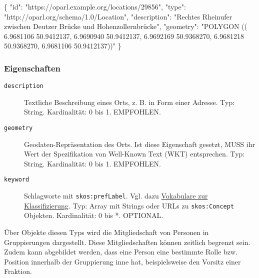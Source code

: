 \documentclass[,a4paper]{article}
\newenvironment{Shaded}{}{}
\newcommand{\DataTypeTok}[1]{\textcolor[rgb]{0.56,0.13,0.00}{{#1}}}
\newcommand{\StringTok}[1]{\textcolor[rgb]{0.25,0.44,0.63}{{#1}}}
\newcommand{\FunctionTok}[1]{\textcolor[rgb]{0.02,0.16,0.49}{{#1}}}
\begin{document}
\begin{Shaded}
\begin{Highlighting}[]
\FunctionTok{\{}
    \DataTypeTok{"id"}\FunctionTok{:} \StringTok{"https://oparl.example.org/locations/29856"}\FunctionTok{,}
    \DataTypeTok{"type"}\FunctionTok{:} \StringTok{"http://oparl.org/schema/1.0/Location"}\FunctionTok{,}
    \DataTypeTok{"description"}\FunctionTok{:} \StringTok{"Rechtes Rheinufer zwischen Deutzer}
\StringTok{        Brücke und Hohenzollernbrücke"}\FunctionTok{,}
    \DataTypeTok{"geometry"}\FunctionTok{:} \StringTok{"POLYGON ((}
\StringTok{                6.9681106 50.9412137,}
\StringTok{                6.9690940 50.9412137,}
\StringTok{                6.9692169 50.9368270,}
\StringTok{                6.9681218 50.9368270,}
\StringTok{                6.9681106 50.9412137))"}
\FunctionTok{\}}
\end{Highlighting}
\end{Shaded}

\subsubsection{Eigenschaften}\label{eigenschaften-9}

\begin{description}
\item[\texttt{description}]
Textliche Beschreibung eines Orts, z. B. in Form einer Adresse. Typ:
String. Kardinalität: 0 bis 1. EMPFOHLEN.
\item[\texttt{geometry}]
Geodaten-Repräsentation des Orts. Ist diese Eigenschaft gesetzt, MUSS
ihr Wert der Spezifikation von Well-Known Text (WKT) entsprechen. Typ:
String. Kardinalität: 0 bis 1. EMPFOHLEN.
\item[\texttt{keyword}]
Schlagworte mit \texttt{skos:prefLabel}. Vgl. dazu
\hyperref[vokabulareux5fklassifizierung]{Vokabulare zur
Klassifizierung}. Typ: Array mit Strings oder URLs zu
\texttt{skos:Concept} Objekten. Kardinalität: 0 bis *. OPTIONAL.
\end{description}


Über Objekte diesen Typs wird die Mitgliedschaft von Personen in
Gruppierungen dargestellt. Diese Mitgliedschaften können zeitlich
begrenzt sein. Zudem kann abgebildet werden, dass eine Person eine
bestimmte Rolle bzw. Position innerhalb der Gruppierung inne hat,
beispielsweise den Vorsitz einer Fraktion.
\end{document}
